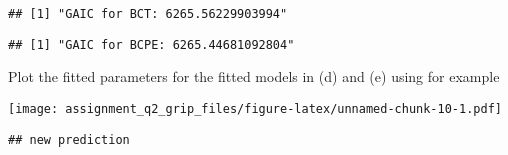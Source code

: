 \begin{verbatim}
## [1] "GAIC for BCT: 6265.56229903994"
\end{verbatim}

\begin{Shaded}
\begin{Highlighting}[]
\NormalTok{(}\NormalTok{(}
\end{Highlighting}
\end{Shaded}

\begin{verbatim}
## [1] "GAIC for BCPE: 6265.44681092804"
\end{verbatim}

Plot the fitted parameters for the fitted models in (d) and (e) using
for example

\begin{Shaded}
\begin{Highlighting}[]
\SpecialCharTok{$}
\end{Highlighting}
\end{Shaded}

\texttt{[image: assignment\_q2\_grip\_files/figure-latex/unnamed-chunk-10-1.pdf]}

\begin{Shaded}
\begin{Highlighting}[]
\OtherTok{\textless{}{-}} \NormalTok{(}\SpecialCharTok{$}\SpecialCharTok{$} \NormalTok{)}

\OtherTok{\textless{}{-}} \NormalTok{(}\NormalTok{)}
\end{Highlighting}
\end{Shaded}

\begin{verbatim}
## new prediction
\end{verbatim}

